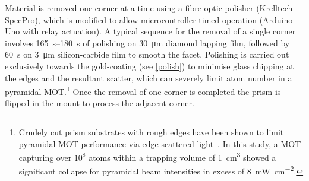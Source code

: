 \documentclass[../Thesis-IJspeert.tex]{subfiles}
\begin{document}
Material is removed one corner at a time using a fibre-optic polisher (Krelltech SpecPro), which is modified to allow microcontroller-timed operation (Arduino Uno with relay actuation). A typical sequence for the removal of a single corner involves \SIrange{165}{180}{\second} of polishing on \SI{30}{\micro\metre} diamond lapping film, followed by \SI{60}{\second} on \SI{3}{\micro\metre} silicon-carbide film to smooth the facet. Polishing is carried out exclusively towards the gold-coating (see \autoref{polish}) to minimise glass chipping at the edges and the resultant scatter, which can severely limit atom number in a pyramidal MOT.\footnote{Crudely cut prism substrates with rough edges have been shown to limit pyramidal-MOT performance via edge-scattered light~\cite{Arlt1998}. In this study, a MOT capturing over $10^{8}$ atoms within a trapping volume of \SI{1}{\centi\metre\cubed} showed a significant collapse for pyramidal beam intensities in excess of \SI{8}{\milli\watt\per\centi\metre\squared}.} Once the removal of one corner is completed the prism is flipped in the mount to process the adjacent corner.
\end{document}
